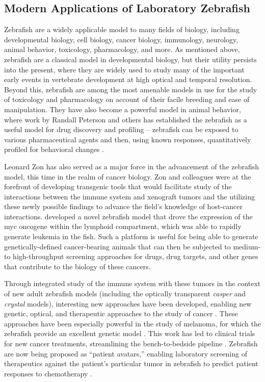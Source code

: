 \subsection{Modern Applications of Laboratory Zebrafish}

Zebrafish are a widely applicable model to many fields of biology, including developmental biology, cell biology, cancer biology, immunology, neurology, animal behavior, toxicology, pharmacology, and more. As mentioned above, zebrafish are a classical model in developmental biology, but their utility persists into the present, where they are widely used to study many of the important early events in vertebrate development at high optical and temporal resolution. Beyond this, zebrafish are among the most amenable models in use for the study of toxicology and pharmacology on account of their facile breeding and ease of manipulation. They have also become a powerful model in animal behavior, where work by Randall Peterson and others has established the zebrafish as a useful model for drug discovery and profiling -- zebrafish can be exposed to various pharmaceutical agents and then, using known responses, quantitatively profiled for behavioral changes \citep{MacRae2003, MacRae2015, Peterson2012, Rihel2010, Kokel2010, Kokel2011, Bruni2016, Zon2005, Patton2021}. 

Leonard Zon has also served as a major force in the advancement of the zebrafish model, this time in the realm of cancer biology. Zon and colleagues were at the forefront of developing transgenic tools that would facilitate study of the interactions between the immune system and xenograft tumors and the utilizing these newly possible findings to advance the field's knowledge of host-cancer interactions. \citet{Cagan2019, Amatruda2002, Langenau2003, Trede2004, McConnell2021} developed a novel zebrafish model that drove the expression of the myc oncogene within the lymphoid compartment, which was able to rapidly generate leukemia in the fish. Such a platform is useful for being able to generate genetically-defined cancer-bearing animals that can then be subjected to medium- to high-throughput screening approaches for drugs, drug targets, and other genes that contribute to the biology of these cancers. 

Through integrated study of the immune system with these tumors in the context of new adult zebrafish models (including the optically transparent \textit{casper} and \textit{crystal} models), interesting new approaches have been developed, enabling new genetic, optical, and therapeutic approaches to the study of cancer \citep{Yan2021, Yan2019, Stern2003, GomezAbenza2019, Hason2019, White2013}. These approaches have been especially powerful in the study of melanoma, for which the zebrafish provide an excellent genetic model \citep{Kaufman2016}. This work has led to clinical trials for new cancer treatments, streamlining the bench-to-bedside pipeline \citep{Hanna2021}. Zebrafish are now being proposed as ``patient avatars,'' enabling laboratory screening of therapeutics against the patient's particular tumor in zebrafish to predict patient responses to chemotherapy \citep{Li2012, Yan2019, Fazio2020}.

